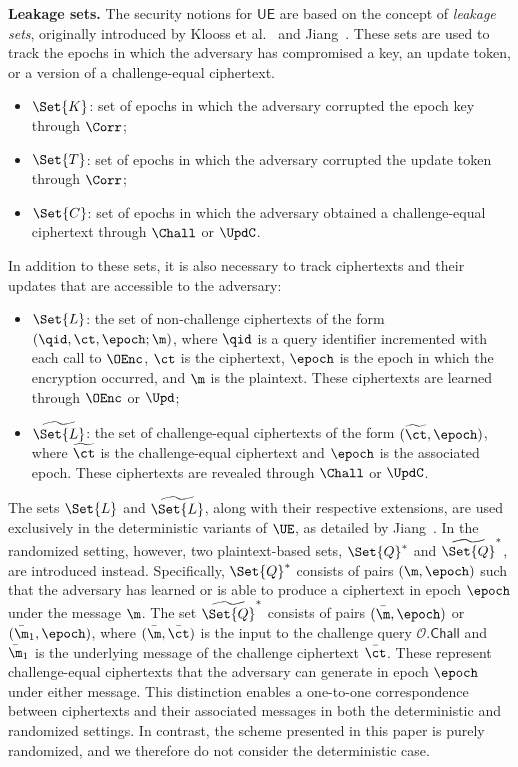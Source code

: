 \documentclass{fundam}
\begin{document}
\vspace{0.3cm}
\noindent\textbf{Leakage sets.} The security notions for $\mathsf{UE}$ are based on the concept of \textit{leakage sets}, originally introduced by Klooss et al.~\cite{klooss2019r} and Jiang~\cite{jiang2020}. These sets are used to track the epochs in which the adversary has compromised a key, an update token, or a version of a challenge-equal ciphertext.
%
\begin{itemize}
	\item $\Set{K}$: set of epochs in which the adversary corrupted the epoch key through $\Corr$; 
	\item $\Set{T}$: set of epochs in which the adversary corrupted the update token through $\Corr$; 
	\item $\Set{C}$: set of epochs in which the adversary obtained a challenge-equal ciphertext through $\Chall$ or $\UpdC$.
\end{itemize}
%
In addition to these sets, it is also necessary to track ciphertexts and their updates that are accessible to the adversary:
\begin{itemize}
	\item $\Set{L}$: the set of non-challenge ciphertexts of the form $(\qid, \ct, \epoch; \m)$, where $\qid$ is a query identifier incremented with each call to $\OEnc$, $\ct$ is the ciphertext, $\epoch$ is the epoch in which the encryption occurred, and $\m$ is the plaintext. These ciphertexts are learned through $\OEnc$ or $\Upd$;
	\item $\widetilde{\Set{L}}$: the set of challenge-equal ciphertexts of the form $(\widetilde{\ct}, \epoch)$, where $\widetilde{\ct}$ is the challenge-equal ciphertext and $\epoch$ is the associated epoch. These ciphertexts are revealed through $\Chall$ or $\UpdC$.
\end{itemize} 
%
The sets $\Set{L}$ and $\widetilde{\Set{L}}$, along with their respective extensions, are used exclusively in the deterministic variants of $\UE$, as detailed by Jiang~\cite{jiang2020}. In the randomized setting, however, two plaintext-based sets, $\Set{Q}^{*}$ and $\widetilde{\Set{Q}}^{*}$, are introduced instead. Specifically, $\Set{Q}^{*}$ consists of pairs $(\m, \epoch)$ such that the adversary has learned or is able to produce a ciphertext in epoch $\epoch$ under the message $\m$. The set $\widetilde{\Set{Q}}^{*}$ consists of pairs $(\bar{\m}, \epoch)$ or $(\bar{\m}_1, \epoch)$, where $(\bar{\m}, \bar{\ct})$ is the input to the challenge query $\mathcal{O}.\mathsf{Chall}$ and $\bar{\m}_1$ is the underlying message of the challenge ciphertext $\bar{\ct}$. These represent challenge-equal ciphertexts that the adversary can generate in epoch $\epoch$ under either message. This distinction enables a one-to-one correspondence between ciphertexts and their associated messages in both the deterministic and randomized settings. In contrast, the scheme presented in this paper is purely randomized, and we therefore do not consider the deterministic case.
\end{document}
